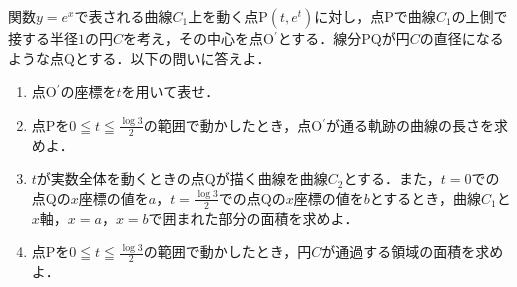 \documentclass[a4paper,fleqn]{ltjsarticle}
\begin{document}
関数$y=e^x$で表される曲線$C_1$上を動く点P$(t,e^t)$に対し，点Pで曲線$C_1$の上側で接する半径$1$の円$C$を考え，その中心を点O$^\prime$とする．線分PQが円$C$の直径になるような点Qとする．以下の問いに答えよ．
\begin{enumerate}[(1)]
    \item 点O$^\prime$の座標を$t$を用いて表せ．
    \item 点Pを$\displaystyle 0\leqq t\leqq \frac{\log3}{2} $の範囲で動かしたとき，点O$^\prime$が通る軌跡の曲線の長さを求めよ．
    \item $t$が実数全体を動くときの点Qが描く曲線を曲線$C_2$とする．また，$t=0$での点Qの$x$座標の値を$a$，$\displaystyle t=\frac{\log3}{2}$での点Qの$x$座標の値を$b$とするとき，曲線$C_1$と$x$軸，$x=a$，$x=b$で囲まれた部分の面積を求めよ．
    \item 点Pを$\displaystyle 0\leqq t\leqq \frac{\log3}{2} $の範囲で動かしたとき，円$C$が通過する領域の面積を求めよ．
\end{enumerate}
\twocolumn
\end{document}
